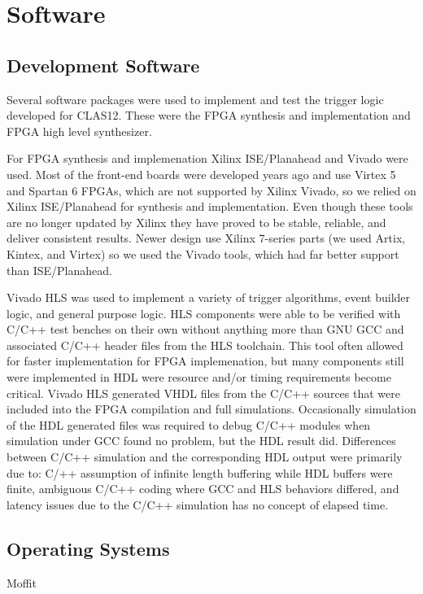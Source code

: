\section{Software}



\subsection{Development Software}

Several software packages were used to implement and test the trigger logic developed for CLAS12. These were the FPGA synthesis and implementation and FPGA high level synthesizer.

For FPGA synthesis and implemenation Xilinx ISE/Planahead and Vivado were used. Most of the front-end boards were developed years ago and use Virtex 5 and Spartan 6 FPGAs, which are not supported by Xilinx Vivado, so we relied on Xilinx ISE/Planahead for synthesis and implementation. Even though these tools are no longer updated by Xilinx they have proved to be stable, reliable, and deliver consistent results. Newer design use Xilinx 7-series parts (we used Artix, Kintex, and Virtex) so we used the Vivado tools, which had far better support than ISE/Planahead.

Vivado HLS was used to implement a variety of trigger algorithms, event builder logic, and general purpose logic. HLS components were able to be verified with C/C++ test benches on their own without anything more than GNU GCC and associated C/C++ header files from the HLS toolchain. This tool often allowed for faster implementation for FPGA implemenation, but many components still were implemented in HDL were resource and/or timing requirements become critical. Vivado HLS generated VHDL files from the C/C++ sources that were included into the FPGA compilation and full simulations. Occasionally simulation of the HDL generated files was required to debug C/C++ modules when simulation under GCC found no problem, but the HDL result did. Differences between C/C++ simulation and the corresponding HDL output were primarily due to: C/++ assumption of infinite length buffering while HDL buffers were finite, ambiguous C/C++ coding where GCC and HLS behaviors differed, and latency issues due to the C/C++ simulation has no concept of elapsed time.

\subsection{Operating Systems} Moffit

